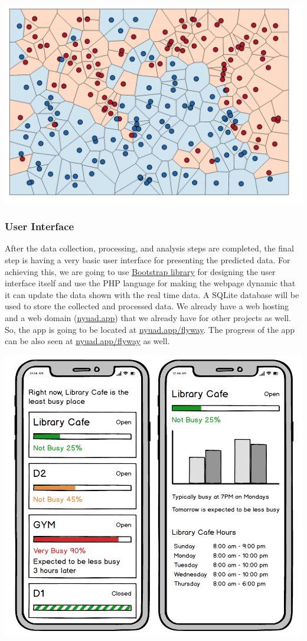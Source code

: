 \documentclass[journal, 12pt]{IEEEtran}
\begin{document}
\begingroup
    \center
    \medskip
    \includegraphics[width=\columnwidth]{report/interim_report/images/clustering.png}
    \label{fig:clustering}
    \medskip
\endgroup



\subsubsection{User Interface} 
After the data collection, processing, and analysis steps are completed, the final step is having a very basic user interface for presenting the predicted data. For achieving this, we are going to use \href{https://getbootstrap.com/}{Bootstrap library} for designing the user interface itself and use the PHP language for making the webpage dynamic that it can update the data shown with the real time data. A SQLite database will be used to store the collected and processed data. We already have a web hosting and a web domain (\href{https://nyuad.app/}{nyuad.app}) that we already have for other projects as well. So, the app is going to be located at \href{https://nyuad.app/flyway/}{nyuad.app/flyway}. The progress of the app can be also seen at \href{https://nyuad.app/flyway/}{nyuad.app/flyway} as well.

\begingroup
    \center
    \medskip
    \includegraphics[width=0.75\columnwidth]{report/interim_report/images/ux.png}
    \label{fig:ux}
    \medskip
\endgroup
\end{document}
